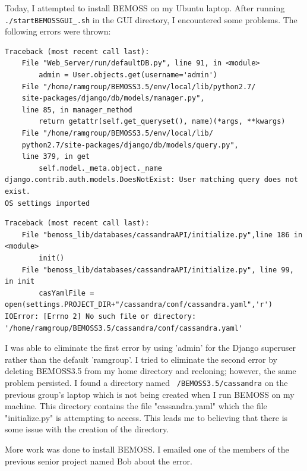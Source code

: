 \documentclass[fontsize=11pt, %
                             paper=letter, %
                             twoside, %
                             captions=tableheading,
                             index=totoc,
                             hyperref]{labbook}
\begin{document}
\begin{addmargin}[0cm]{0cm}
Today, I attempted to install BEMOSS on my Ubuntu laptop. After running \texttt{./startBEMOSSGUI\_.sh} in the GUI directory, I encountered some problems. The following errors were thrown:
\begin{Verbatim}[tabsize=4]
Traceback (most recent call last):
	File "Web_Server/run/defaultDB.py", line 91, in <module>
		admin = User.objects.get(username='admin')
	File "/home/ramgroup/BEMOSS3.5/env/local/lib/python2.7/
	site-packages/django/db/models/manager.py", 
	line 85, in manager_method
		return getattr(self.get_queryset(), name)(*args, **kwargs)
	File "/home/ramgroup/BEMOSS3.5/env/local/lib/
	python2.7/site-packages/django/db/models/query.py", 
	line 379, in get
		self.model._meta.object._name
django.contrib.auth.models.DoesNotExist: User matching query does not exist.
OS settings imported
\end{Verbatim}

\begin{Verbatim}[tabsize=4]
Traceback (most recent call last):
	File "bemoss_lib/databases/cassandraAPI/initialize.py",line 186 in
<module>
		init()
	File "bemoss_lib/databases/cassandraAPI/initialize.py", line 99, in init
		casYamlFile = open(settings.PROJECT_DIR+"/cassandra/conf/cassandra.yaml",'r')
IOError: [Errno 2] No such file or directory: 
'/home/ramgroup/BEMOSS3.5/cassandra/conf/cassandra.yaml'
\end{Verbatim}

I was able to eliminate the first error by using 'admin' for the Django superuser rather than the default 'ramgroup'. I tried to eliminate the second error by deleting BEMOSS3.5 from my home directory and recloning; however, the same problem persisted. I found a directory named \texttt{~/BEMOSS3.5/cassandra} on the previous group's laptop which is not being created when I run BEMOSS on my machine. This directory contains the file "cassandra.yaml" which the file "initialize.py" is attempting to access. This leads me to believing that there is some issue with the creation of the directory.

More work was done to install BEMOSS. I emailed one of the members of the previous senior project named Bob about the error.


\end{addmargin}
\end{document}
